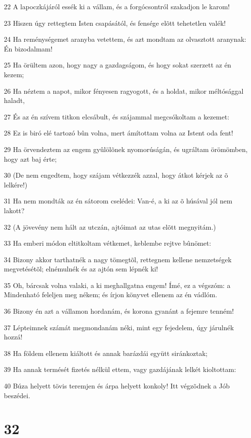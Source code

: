 \par 22 A lapoczkájáról essék ki a vállam, és a forgócsontról szakadjon le karom!
\par 23 Hiszen úgy rettegtem Isten csapásától, és fensége elõtt tehetetlen valék!
\par 24 Ha reménységemet aranyba vetettem, és azt mondtam az olvasztott aranynak: Én bizodalmam!
\par 25 Ha örültem azon, hogy nagy a gazdagságom, és hogy sokat szerzett az én kezem;
\par 26 Ha néztem a napot, mikor fényesen ragyogott, és a holdat, mikor méltósággal haladt,
\par 27 És az én szívem titkon elcsábult, és szájammal megcsókoltam a kezemet:
\par 28 Ez is biró elé tartozó bûn volna, mert ámítottam volna az Istent oda fent!
\par 29 Ha örvendeztem az engem gyûlölõnek nyomorúságán, és ugráltam örömömben, hogy azt baj érte;
\par 30 (De nem engedtem, hogy szájam vétkezzék azzal, hogy átkot kérjek az õ lelkére!)
\par 31 Ha nem mondták az én sátorom cselédei: Van-é, a ki az õ húsával jól nem lakott?
\par 32 (A jövevény nem hált az utczán, ajtóimat az utas elõtt megnyitám.)
\par 33 Ha emberi módon eltitkoltam vétkemet, keblembe rejtve bûnömet:
\par 34 Bizony akkor tarthatnék a nagy tömegtõl, rettegnem kellene nemzetségek megvetésétõl; elnémulnék és az ajtón sem lépnék ki!
\par 35 Oh, bárcsak volna valaki, a ki meghallgatna engem! Ímé, ez a végszóm: a Mindenható feleljen meg nékem; és írjon könyvet ellenem az én vádlóm.
\par 36 Bizony én azt a vállamon hordanám, és korona gyanánt a fejemre tenném!
\par 37 Lépteimnek számát megmondanám néki, mint egy fejedelem, úgy járulnék hozzá!
\par 38 Ha földem ellenem kiáltott és annak barázdái együtt siránkoztak;
\par 39 Ha annak termését fizetés nélkül ettem, vagy gazdájának lelkét kioltottam:
\par 40 Búza helyett tövis teremjen és árpa helyett konkoly! Itt végzõdnek a Jób beszédei.

\chapter{32}

